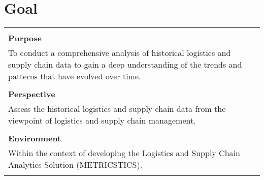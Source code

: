 	\section{Goal}
\begin{tabular}{|p{14cm}|}
	\hline
	\\
	\textbf{Purpose} \\
	To conduct a comprehensive analysis of historical logistics and supply chain data to gain a deep understanding of the trends and patterns that have evolved over time. \\
	\\
	\textbf{Perspective} \\
	Assess the historical logistics and supply chain data from the viewpoint of logistics and supply chain management. \\
	\\
	\textbf{Environment} \\
	Within the context of developing the Logistics and Supply Chain Analytics Solution (METRICSTICS). \\
	\\
	\hline
\end{tabular}

